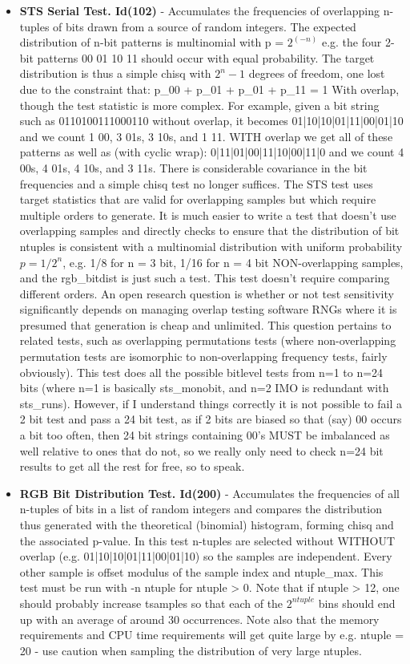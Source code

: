 \begin{itemize}
   \item \textbf{STS Serial Test. Id(102)} - Accumulates the frequencies of overlapping n-tuples of bits drawn from a source of random integers.  The expected distribution of n-bit patterns is multinomial with p = $2^{(-n)}$ e.g. the four 2-bit patterns 00 01 10 11 should occur with equal probability. The target distribution is thus a simple chisq with $2^{n} - 1$ degrees of freedom, one lost due to the constraint that: p\_00 + p\_01 + p\_01 + p\_11 = 1 With overlap, though the test statistic is more complex. For example, given a bit string such as 0110100111000110 without overlap, it becomes 01|10|10|01|11|00|01|10 and we count 1 00, 3 01s, 3 10s, and 1 11. WITH overlap we get all of these patterns as well as (with cyclic wrap): 0|11|01|00|11|10|00|11|0 and we count 4 00s, 4 01s, 4 10s, and 3 11s. There is considerable covariance in the bit frequencies and a simple chisq test no longer suffices. The STS test uses target statistics that are valid for overlapping samples but which require multiple orders to generate. It is much easier to write a test that doesn't use overlapping samples and directly checks to ensure that the distribution of bit ntuples is consistent with a multinomial distribution with uniform probability $p = 1/2^n$, e.g. 1/8 for n = 3 bit, 1/16 for n = 4 bit NON-overlapping samples, and the rgb\_bitdist is just such a test. This test doesn't require comparing different orders. An open research question is whether or not test sensitivity significantly depends on managing overlap testing software RNGs where it is presumed that generation is cheap and unlimited. This question pertains to related tests, such as overlapping permutations tests (where non-overlapping permutation tests are isomorphic to non-overlapping frequency tests, fairly obviously). This test does all the possible bitlevel tests from n=1 to n=24 bits (where n=1 is basically sts\_monobit, and n=2 IMO is redundant with sts\_runs).  However, if I understand things correctly it is not possible to fail a 2 bit test and pass a 24 bit test, as if 2 bits are biased so that (say) 00 occurs a bit too often, then 24 bit strings containing 00's MUST be imbalanced as well relative to ones that do not, so we really only need to check n=24 bit results to get all the rest for free, so to speak.
   
   \item \textbf{RGB Bit Distribution Test. Id(200)} - Accumulates the frequencies of all n-tuples of bits in a list of random integers and compares the distribution thus generated with the theoretical (binomial) histogram, forming chisq and the associated p-value.  In this test n-tuples are selected without WITHOUT overlap (e.g. 01|10|10|01|11|00|01|10) so the samples are independent.  Every other sample is offset modulus of the sample index and ntuple\_max. This test must be run with -n ntuple for ntuple > 0.  Note that if ntuple > 12, one should probably increase tsamples so that each of the $2^{ntuple}$ bins should end up with an average of around 30 occurrences. Note also that the memory requirements and CPU time requirements will get quite large by e.g. ntuple = 20 - use caution when sampling the distribution of very large ntuples. 
   

\end{itemize}
